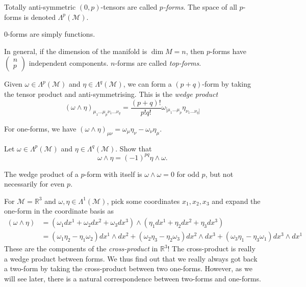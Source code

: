 \begin{definition}[p-forms]
  Totally anti-symmetric $(0, p)$-tensors are called \emph{$p$-forms}. The space of all $p$-forms is denoted $\Lambda^p (\mathcal{M})$.
\end{definition}
\begin{example}[]
  $0$-forms are simply functions.
\end{example}
In general, if the dimension of the manifold is $\dim M = n$, then $p$-forms have $ \left( \begin{gathered} n \\ p \end{gathered} \right) $ independent components.
$n$-forms are called \emph{top-forms}.
\begin{definition}
  Given $\omega \in \Lambda^p(\mathcal{M})$ and $\eta \in \Lambda^q (\mathcal{M})$, we can form a $(p + q)$-form by taking the tensor product and anti-symmetrising.
  This is the \emph{wedge product}
  \begin{equation}
    (\omega \wedge \eta)_{\mu_1 \dots \mu_p \nu_1 \dots \nu_q} = \frac{(p + q)!}{p! q!} \omega_{[\mu_1 \dots \mu_p} \eta_{\nu_1 \dots \nu_q]}
  \end{equation}
\end{definition}
\begin{example}[]
  For one-forms, we have $(\omega \wedge \eta)_{\mu\nu} = \omega_\mu \eta_\nu - \omega_\nu \eta_\mu$.
\end{example}
\begin{exercise}
  Let $\omega \in \Lambda^{p}(\mathcal{M})$ and $\eta \in \Lambda^{q}(\mathcal{M})$. Show that 
  \begin{equation}
    \omega \wedge \eta = (-1)^{pq} \eta \wedge \omega.
  \end{equation}
\end{exercise}
\begin{corollary}
  The wedge product of a $p$-form with itself is $\omega \wedge \omega = 0$ for odd $p$, but not necessarily for even $p$.
\end{corollary}

\begin{example}
  For $\mathcal{M} = \mathbb{R}^3$ and $\omega, \eta \in \Lambda^1(\mathcal{M})$, pick some coordinates $x_1, x_2, x_3$ and expand the one-form in the coordinate basis as
  \begin{align}
    (\omega \wedge \eta) &= (\omega_1 dx^1 + \omega_2 dx^2 + \omega_3 dx^3) \wedge (\eta_1 dx^1 + \eta_2 dx^2 + \eta_3 dx^3) \\
			 &= (\omega_1 \eta_2 - \eta_1 \omega_2) dx^1 \wedge dx^2
			 + (\omega_2 \eta_3 - \eta_2 \omega_3) dx^2 \wedge dx^3
			 + (\omega_3 \eta_1 - \eta_3 \omega_1) dx^3 \wedge dx^1 
  \end{align}
  These are the components of the \emph{cross-product} in $\mathbb{R}^3$!
  The cross-product is really a wedge product between forms.
  We thus find out that we really always got back a two-form by taking the cross-product between two one-forms. However, as we will see later, there is a natural correspondence between two-forms and one-forms.
\end{example}


